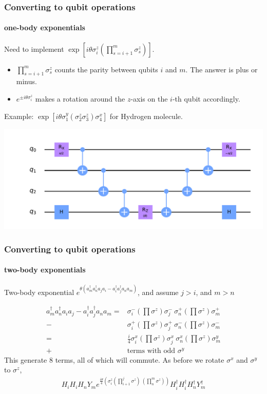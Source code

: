 \documentclass{beamer}
\renewcommand{\(}{\left(}
\renewcommand{\)}{\right)}
\renewcommand{\[}{\left[}
\renewcommand{\]}{\right]}
\begin{document}
\begin{frame}
    \frametitle{Converting to qubit operations}
    \framesubtitle{one-body exponentials}
    Need to implement $\exp\[i\theta \sigma^{z}_i \(\prod_{s=i+1}^{m} \sigma_s^z\) \]$. 
    \begin{itemize}
        \item $\prod_{s=i+1}^{m} \sigma_s^z$ counts the parity between qubits $i$ and $m$. The answer is plus or minus. 
        \item $e^{\pm i \theta\sigma^z_i }$ makes a rotation around the $z$-axis on the $i$-th qubit accordingly. 
    \end{itemize}
    \pause
    Example: $\exp\[i\theta \sigma^{y}_1 (\sigma_2^z \sigma_3^z )\sigma^{x}_4 \]$ for Hydrogen molecule.  
    \begin{center}
        \includegraphics[scale = 0.45, trim = 65 0 0 0 , clip]{a_4a_1_r.pdf} 
    \end{center}
\end{frame}

\begin{frame}
    \frametitle{Converting to qubit operations}
    \framesubtitle{two-body exponentials}

    Two-body exponential $e^{\theta (a^\dagger_m a^\dagger_n a_j a_i - a^\dagger_i a^\dagger_j a_n a_m  )}$, and assume $j>i$, and $m>n$ 

    \begin{align*}
        a^\dagger_m a^\dagger_n a_i a_j - a^\dagger_i a^\dagger_j a_n a_m  = &\sigma^{-}_i \(\prod \sigma^{z}\) \sigma^{-}_j\  \sigma^{+}_n \(\prod \sigma^{z}\) \sigma^{+}_m \\ 
        - & \sigma^{+}_i \(\prod \sigma^{z}\) \sigma^{+}_j\  \sigma^{-}_n \(\prod \sigma^{z}\) \sigma^{-}_m \\ 
        = & \frac{i}{4} \sigma^{x}_i \(\prod \sigma^{z}\) \sigma^{x}_j \  \sigma^{x}_n \(\prod \sigma^{z}\) \sigma^{y}_m \\ 
        + &\text{terms with odd } \sigma^{y} 
    \end{align*}
    This generate $8$ terms, all of which will commute. As before we rotate $\sigma^x$ and $\sigma^y$ to $\sigma^{z}$, 
    \begin{align*}
        H_i H_i H_n Y_m e^{\frac{i\theta}{4} \(\sigma^{z}_i \(\prod_{i+1}^{j} \sigma^{z}\)\  \(\prod_{n}^m \sigma^{z}\) \)} H^\dagger_i H^\dagger_i H^\dagger_n Y^\dagger_m
    \end{align*}
    
\end{frame}
\end{document}
